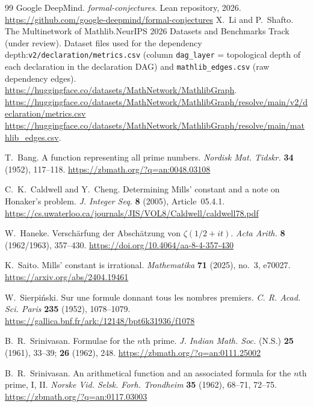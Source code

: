 \documentclass[11pt,reqno]{amsart}
\theoremstyle{blueplain}
\numberwithin{equation}{section}
\begin{document}
\begin{thebibliography}{99}
	Google DeepMind.
	\emph{formal-conjectures}.
	Lean repository, 2026.
	\url{https://github.com/google-deepmind/formal-conjectures}
	 X.~Li and P.~Shafto. The Multinetwork of
Mathlib.\newline NeurIPS 2026 Datasets and Benchmarks Track (under review).\newline
Dataset files used for the dependency depth:\newline \texttt{v2/declaration/metrics.csv}
(column \texttt{dag\_layer} = topological depth of each declaration in the
declaration DAG) and \texttt{mathlib\_edges.csv} (raw dependency edges).\newline
{\scriptsize
	\url{https://huggingface.co/datasets/MathNetwork/MathlibGraph}.\newline
	\url{https://huggingface.co/datasets/MathNetwork/MathlibGraph/resolve/main/v2/declaration/metrics.csv}\newline
	\url{https://huggingface.co/datasets/MathNetwork/MathlibGraph/resolve/main/mathlib_edges.csv}.}

	T.~Bang.
	A function representing all prime numbers.
	\emph{Nordisk Mat. Tidskr.} \textbf{34} (1952), 117--118.
	\url{https://zbmath.org/?q=an:0048.03108}
	
	C.~K.~Caldwell and Y.~Cheng.
	Determining Mills' constant and a note on Honaker's problem.
	\emph{J. Integer Seq.} \textbf{8} (2005), Article~05.4.1.
	\url{https://cs.uwaterloo.ca/journals/JIS/VOL8/Caldwell/caldwell78.pdf}
	
	W.~Haneke.
	Versch\"arfung der Absch\"atzung von \(\zeta(1/2+it)\).
	\emph{Acta Arith.} \textbf{8} (1962/1963), 357--430.
	\url{https://doi.org/10.4064/aa-8-4-357-430}
	
	K.~Saito.
	Mills' constant is irrational.
	\emph{Mathematika} \textbf{71} (2025), no.~3, e70027.
	\url{https://arxiv.org/abs/2404.19461}
	
	W.~Sierpi\'nski.
	Sur une formule donnant tous les nombres premiers.
	\emph{C. R. Acad. Sci. Paris} \textbf{235} (1952), 1078--1079.
	\url{https://gallica.bnf.fr/ark:/12148/bpt6k31936/f1078}
	
	B.~R.~Srinivasan.
	Formulae for the \(n\)th prime.
	\emph{J. Indian Math. Soc.} (N.S.) \textbf{25} (1961), 33--39;
	\textbf{26} (1962), 248.
	\url{https://zbmath.org/?q=an:0111.25002}
	
	B.~R.~Srinivasan.
	An arithmetical function and an associated formula for the \(n\)th prime,
	I, II.
	\emph{Norske Vid. Selsk. Forh. Trondheim}
	\textbf{35} (1962), 68--71, 72--75.
	\url{https://zbmath.org/?q=an:0117.03003}
	

\end{thebibliography}
\end{document}
